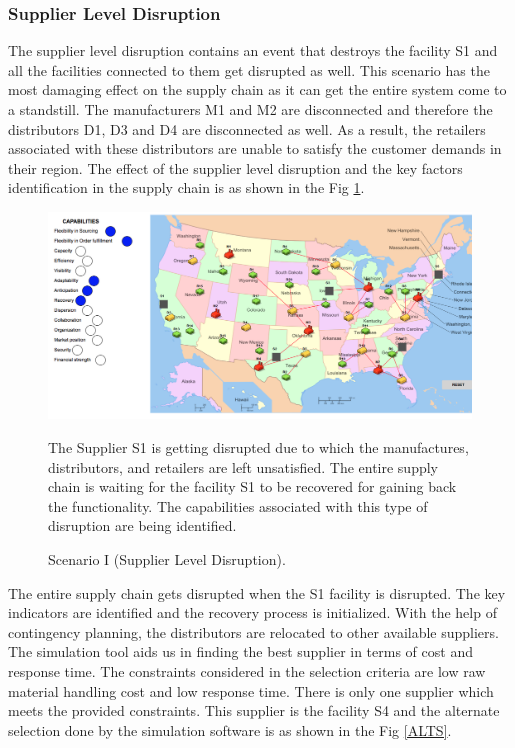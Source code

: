 \newpage
\subsubsection{Supplier Level Disruption}

The supplier level disruption contains an event that destroys the facility S1 and all the facilities connected to them get disrupted as well. This scenario has the most damaging effect on the supply chain as it can get the entire system come to a standstill. The manufacturers M1 and M2 are disconnected and therefore the distributors D1, D3 and D4 are disconnected as well. As a result, the retailers associated with these distributors are unable to satisfy the customer demands in their region. The effect of the supplier level disruption and the key factors identification in the supply chain is as shown in the Fig \ref{S1SD}.

\begin{figure}[H]
  \centering
  \includegraphics[width=6.5in]{figures/pdf/S1SLD.png}\\
  \caption{Scenario I (Supplier Level Disruption).}
   {The Supplier S1 is getting disrupted due to which the manufactures, distributors, and retailers are left unsatisfied. The entire supply chain is waiting for the facility S1 to be recovered for gaining back the functionality. The capabilities associated with this type of disruption are being identified.}
  \label{S1SD}
\end{figure}    

The entire supply chain gets disrupted when the S1 facility is disrupted. The key indicators are identified and the recovery process is initialized. With the help of contingency planning, the distributors are relocated to other available suppliers. The simulation tool aids us in finding the best supplier in terms of cost and response time. The constraints considered in the selection criteria are low raw material handling cost and low response time. There is only one supplier which meets the provided constraints. This supplier is the facility S4 and the alternate selection done by the simulation software is as shown in the Fig \ref{ALTS}.

